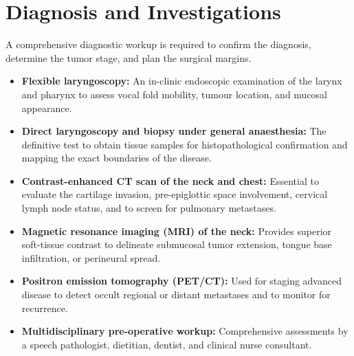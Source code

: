 \section*{Diagnosis and Investigations}
A comprehensive diagnostic workup is required to confirm the diagnosis, determine the tumor stage, and plan the surgical margins.
\begin{itemize}
    \item \textbf{Flexible laryngoscopy:} An in-clinic endoscopic examination of the larynx and pharynx to assess vocal fold mobility, tumour location, and mucosal appearance.
    \item \textbf{Direct laryngoscopy and biopsy under general anaesthesia:} The definitive test to obtain tissue samples for histopathological confirmation and mapping the exact boundaries of the disease.
    \item \textbf{Contrast-enhanced CT scan of the neck and chest:} Essential to evaluate the cartilage invasion, pre-epiglottic space involvement, cervical lymph node status, and to screen for pulmonary metastases.
    \item \textbf{Magnetic resonance imaging (MRI) of the neck:} Provides superior soft-tissue contrast to delineate submucosal tumor extension, tongue base infiltration, or perineural spread.
    \item \textbf{Positron emission tomography (PET/CT):} Used for staging advanced disease to detect occult regional or distant metastases and to monitor for recurrence.
    \item \textbf{Multidisciplinary pre-operative workup:} Comprehensive assessments by a speech pathologist, dietitian, dentist, and clinical nurse consultant.
\end{itemize}


